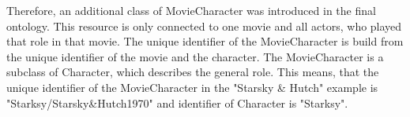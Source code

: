 Therefore, an additional class of MovieCharacter was introduced in the final ontology.
This resource is only connected to one movie and all actors, who played that role in that movie.
The unique identifier of the MovieCharacter is build from the unique identifier of the movie and the character.
The MovieCharacter is a subclass of Character, which describes the general role.
This means, that the unique identifier of the MovieCharacter in the "Starsky \& Hutch" example is "Starksy/Starsky\&Hutch1970" and identifier of Character is "Starksy".